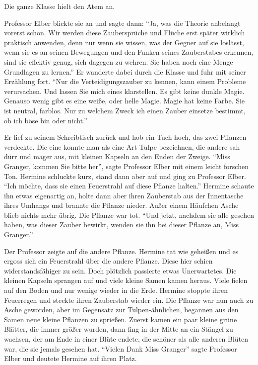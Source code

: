 Die ganze Klasse hielt den Atem an.

Professor Elber blickte sie an und sagte dann: \enquote{Ja, \gst was die Theorie anbelangt vorerst schon. Wir werden diese Zaubersprüche und Flüche erst später wirklich praktisch anwenden, denn nur wenn sie wissen, was der Gegner auf sie loslässt, wenn sie es an seinen Bewegungen und den Funken seines Zauberstabes erkennen, sind sie effektiv genug, sich dagegen zu wehren. Sie haben noch eine Menge Grundlagen zu lernen.} Er wanderte dabei durch die Klasse und fuhr mit seiner Erzählung fort. \enquote{Nur die Verteidigungszauber zu kennen, kann einem Probleme verursachen. Und lassen Sie mich eines klarstellen. Es gibt keine dunkle Magie. Genauso wenig gibt es eine weiße, oder helle Magie. Magie hat keine Farbe. Sie ist neutral, farblos. Nur zu welchem Zweck ich einen Zauber einsetze bestimmt, ob ich böse bin oder nicht.}

Er lief zu seinem Schreibtisch zurück und hob ein Tuch hoch, das zwei Pflanzen verdeckte. Die eine konnte man als eine Art Tulpe bezeichnen, die andere sah dürr und mager aus, mit kleinen Kapseln an den Enden der Zweige. \enquote{Miss Granger, kommen Sie bitte her}, sagte Professor Elber mit einem leicht forschen Ton. Hermine schluckte kurz, stand dann aber auf und ging zu Professor Elber. \enquote{Ich möchte, dass sie einen Feuerstrahl auf diese Pflanze halten.} Hermine schaute ihn etwas eigenartig an, holte dann aber ihren Zauberstab aus der Innentasche ihres Umhangs und brannte die Pflanze nieder. Außer einem Häufchen Asche blieb nichts mehr übrig. Die Pflanze war tot. \enquote{Und jetzt, nachdem sie alle gesehen haben, was dieser Zauber bewirkt, wenden sie ihn bei dieser Pflanze an, Miss Granger.}

Der Professor zeigte auf die andere Pflanze. Hermine tat wie geheißen und es ergoss sich ein Feuerstrahl über die andere Pflanze. Diese hier schien widerstandsfähiger zu sein. Doch plötzlich passierte etwas Unerwartetes. Die kleinen Kapseln sprangen auf und viele kleine Samen kamen heraus. Viele fielen auf den Boden und nur wenige wieder in die Erde. Hermine stoppte ihren Feuerregen und steckte ihren Zauberstab wieder ein. Die Pflanze war nun auch zu Asche geworden, aber im Gegensatz zur Tulpen-ähnlichen, begannen aus den Samen neue kleine Pflanzen zu sprießen. Zuerst kamen ein paar kleine grüne Blätter, die immer größer wurden, dann fing in der Mitte an ein Stängel zu wachsen, der am Ende in einer Blüte endete, die schöner als alle anderen Blüten war, die sie jemals gesehen hat. \enquote{Vielen Dank Miss Granger} sagte Professor Elber und deutete Hermine auf ihren Platz.

